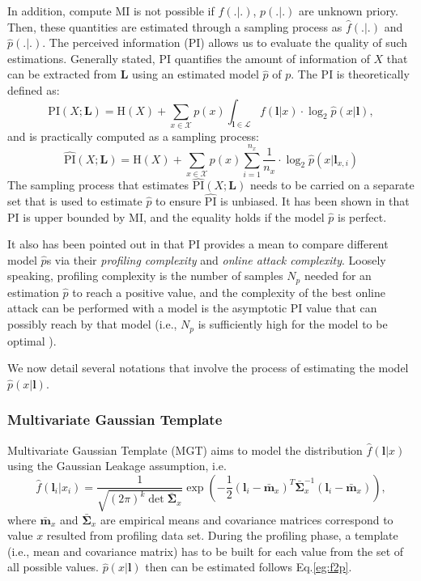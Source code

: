 \documentclass{llncs}
\begin{document}
	In addition, compute MI is not possible if $f(.|.)$, $p(.|.)$ are unknown priory. Then, these quantities are estimated through a sampling process as $\hat{f}(.|.)$ and $\hat{p}(.|.)$. The perceived information (PI) allows us to evaluate the quality of such estimations. Generally stated, PI quantifies the amount of information of $X$ that can be extracted from $\bm{L}$ using an estimated model $\hat{p}$ of $p$. The PI is theoretically defined as:
	\begin{equation*}
		\text{PI}(X; \bm{L}) = \text{H}(X) + \sum_{x \in \mathcal{X}} p(x)\int_{\bm{l} \in \mathcal{L}}f(\bm{l}|x)\cdot \log_2 \hat{p}(x|\bm{l}),
	\end{equation*}
	and is practically computed as a sampling process:
	\begin{equation}\label{eq:pi}
		\widehat{\text{PI}}(X; \bm{L}) = \text{H}(X) + \sum_{x \in \mathcal{X}} p(x)\sum_{i=1}^{n_x}\frac{1}{n_x}\cdot \log_2 \hat{p}(x|\bm{l}_{x, i})
	\end{equation}
	The sampling process that estimates $\widehat{\text{PI}}(X;  \bm{L})$ needs to be carried on a separate set that is used to estimate  $\hat{p}$ to ensure $\widehat{\text{PI}}$ is unbiased. It has been shown in \cite{lcert} that PI is upper bounded by MI, and the equality holds if the model $\hat{p}$ is perfect.
	
	It also has been pointed out in \cite{distinguishers} that PI provides a mean to compare different model $\hat{p}$s via their \textit{profiling complexity} and \textit{online attack complexity}. Loosely speaking, profiling complexity is the number of samples $N_p$ needed for an estimation $\hat{p}$ to reach a positive value, and the complexity of the best online attack can be performed with a model is the asymptotic PI value that can possibly reach by that model (i.e., $N_p$ is sufficiently high for the model to be optimal ).
	
	We now detail several notations that involve the process of estimating the model $\hat{p}(x|\bm{l})$.
	
	
	\subsubsection*{Multivariate Gaussian Template}
	
	Multivariate Gaussian Template (MGT) aims to model the distribution $\hat{f}(\bm{l}|x)$ using the Gaussian Leakage assumption, i.e.
	\begin{equation}\label{eq:gmt}
		\displaystyle	\hat{f}(\bm{l}_i|x_i) = \frac{1}{\sqrt{(2\pi)^k\det \bar{\bm{\Sigma}}_{x}}}\exp\left(  -\frac{1}{2}(\bm{l}_i - \bar{\bm{m}}_{x})^T\bar{\bm{\Sigma}}_{x}^{-1} (\bm{l}_i - \bar{\bm{m}}_{x})\right) , 
	\end{equation}
	where $\bar{\bm{m}}_{x}$ and $ \bar{\bm{\Sigma}}_{x}$ are empirical means and covariance matrices correspond to value $x$ resulted from profiling data set. During the profiling phase, a template (i.e., mean and covariance matrix) has to be built for each value from the set of all possible values. 
	$\hat{p}(x|\bm{l})$ then can be estimated follows Eq.\ref{eg:f2p}.
\end{document}
